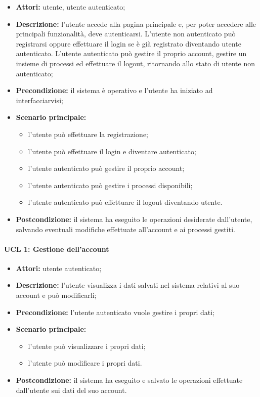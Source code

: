 \begin{itemize}
\item \textbf{Attori:} utente, utente autenticato;
\item \textbf{Descrizione:} l'utente accede alla pagina principale e, per poter accedere alle principali funzionalità, deve autenticarsi.
L'utente non autenticato può registrarsi oppure effettuare il login se è già registrato diventando utente autenticato.
L'utente autenticato può gestire il proprio account, gestire un insieme di processi ed effettuare il logout, ritornando allo stato di utente non autenticato;
\item \textbf{Precondizione:} il sistema è operativo e l'utente ha iniziato ad interfacciarvisi;
\item \textbf{Scenario principale:}
\begin{itemize}
\item l'utente può effettuare la registrazione;
\item l'utente può effettuare il login e diventare autenticato;
\item l'utente autenticato può gestire il proprio account;
\item l'utente autenticato può gestire i processi disponibili;
\item l'utente autenticato può effettuare il logout diventando utente.
\end{itemize}
\item \textbf{Postcondizione:} il sistema ha eseguito le operazioni desiderate dall'utente, salvando eventuali modifiche effettuate all'account e ai processi gestiti.
\end{itemize}

\paragraph{UCL 1: Gestione dell'account} %
\begin{itemize}
	\item \textbf{Attori:} utente autenticato;
	\item \textbf{Descrizione:} l'utente visualizza i dati salvati nel sistema relativi al suo account e può modificarli;
	\item \textbf{Precondizione:} l'utente autenticato vuole gestire i propri dati;
	\item \textbf{Scenario principale:}
	\begin{itemize}
		\item l'utente può visualizzare i propri dati;
		\item l'utente può modificare i propri dati.
	\end{itemize}
	\item \textbf{Postcondizione:} il sistema ha eseguito e salvato le operazioni effettuate dall'utente sui dati del suo account.
\end{itemize}

